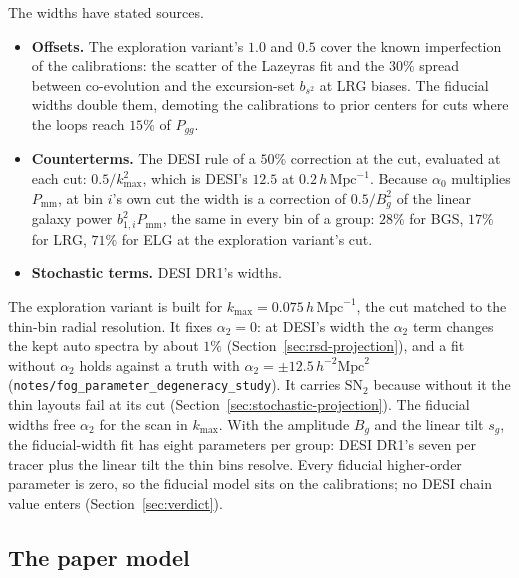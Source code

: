 \documentclass[11pt]{article}
\newcommand{\bs}{b_{s^2}}          %
\newcommand{\pnl}{P_{\mathrm{mm}}}
\newcommand{\kmax}{k_{\mathrm{max}}}
\newcommand{\hMpc}{\,h\,\mathrm{Mpc}^{-1}}
\newcommand{\aunit}{\,h^{-2}\mathrm{Mpc}^2}
\newcommand{\SNt}{\mathrm{SN}_2}
\begin{document}
The widths have stated sources.
\begin{itemize}
\item \textbf{Offsets.}  The exploration variant's $1.0$ and $0.5$
cover the known
imperfection of the calibrations: the scatter of the Lazeyras fit and
the $30\%$ spread between co-evolution and the excursion-set $\bs$ at
LRG biases.  The fiducial widths double them, demoting the
calibrations to prior
centers for cuts where the loops reach $15\%$ of $P_{gg}$.
\item \textbf{Counterterms.}  The DESI rule of a $50\%$ correction at
the cut, evaluated at each cut: $0.5/\kmax^2$, which is DESI's $12.5$
at $0.2\hMpc$.  Because $\alpha_0$ multiplies $\pnl$, at bin $i$'s own
cut the width is a correction of $0.5/B_g^2$ of the linear galaxy power
$b_{1,i}^2\pnl$, the same in every bin of a group: $28\%$ for BGS,
$17\%$ for LRG, $71\%$ for ELG at the exploration variant's cut.
\item \textbf{Stochastic terms.}  DESI DR1's widths.
\end{itemize}

The exploration variant is built for $\kmax = 0.075\hMpc$, the cut
matched to the
thin-bin radial resolution.  It fixes $\alpha_2 = 0$: at DESI's width
the $\alpha_2$ term changes the kept auto spectra by about $1\%$
(Section~\ref{sec:rsd-projection}), and a fit without $\alpha_2$ holds
against a truth with $\alpha_2 = \pm12.5\aunit$
(\texttt{notes/fog\_parameter\_degeneracy\_study}).  It carries
$\SNt$ because without it the thin layouts fail at its cut
(Section~\ref{sec:stochastic-projection}).  The fiducial widths free
$\alpha_2$
for the scan in $\kmax$.  With the amplitude $B_g$ and the linear tilt
$s_g$, the fiducial-width fit has eight parameters per group: DESI DR1's
seven per tracer \cite{DESI2024V,DESI2024VII} plus the linear tilt the
thin bins resolve.  Every fiducial higher-order parameter is zero, so
the fiducial model sits on the calibrations; no DESI chain value
enters (Section~\ref{sec:verdict}).

\subsection{The paper model}
\label{sec:papermodel}
\end{document}
